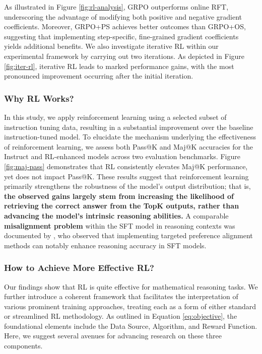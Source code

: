 \begin{itemize}[topsep=0pt]
\begin{itemize}[topsep=0pt]
As illustrated in Figure \ref{fig:rl-analysis}, GRPO outperforms online RFT, underscoring the advantage of modifying both positive and negative gradient coefficients. Moreover, GRPO+PS achieves better outcomes than GRPO+OS, suggesting that implementing step-specific, fine-grained gradient coefficients yields additional benefits. We also investigate iterative RL within our experimental framework by carrying out two iterations. As depicted in Figure \ref{fig:iter-rl}, iterative RL leads to marked performance gains, with the most pronounced improvement occurring after the initial iteration.

\subsubsection{Why RL Works?} In this study, we apply reinforcement learning using a selected subset of instruction tuning data, resulting in a substantial improvement over the baseline instruction-tuned model. To elucidate the mechanism underlying the effectiveness of reinforcement learning, we assess both Pass@K and Maj@K accuracies for the Instruct and RL-enhanced models across two evaluation benchmarks. Figure \ref{fig:maj-pass} demonstrates that RL consistently elevates Maj@K performance, yet does not impact Pass@K. These results suggest that reinforcement learning primarily strengthens the robustness of the model’s output distribution; that is, \textbf{the observed gains largely stem from increasing the likelihood of retrieving the correct answer from the TopK outputs, rather than advancing the model’s intrinsic reasoning abilities.} A comparable \textbf{misalignment problem} within the SFT model in reasoning contexts was documented by \citep{wang2023making}, who observed that implementing targeted preference alignment methods \citep{yuan2023rrhf,song2023preference,wang2023making} can notably enhance reasoning accuracy in SFT models.

\subsubsection{How to Achieve More Effective RL?}
\label{sec:effec_rl}
Our findings show that RL is quite effective for mathematical reasoning tasks. We further introduce a coherent framework that facilitates the interpretation of various prominent training approaches, treating each as a form of either standard or streamlined RL methodology. As outlined in Equation \ref{eq:objective}, the foundational elements include the Data Source, Algorithm, and Reward Function. Here, we suggest several avenues for advancing research on these three components.


\end{itemize}
\end{itemize}
